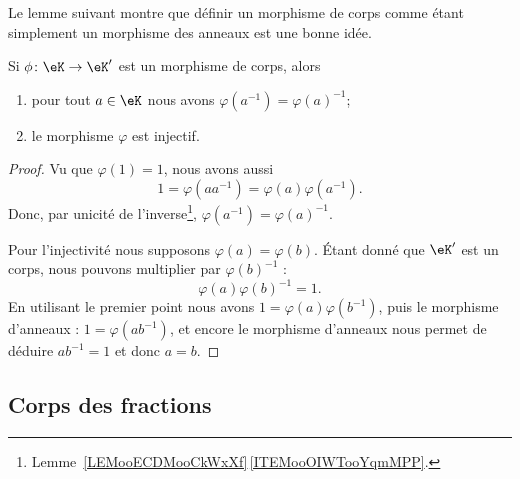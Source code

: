 Le lemme suivant montre que définir un morphisme de corps comme étant simplement un morphisme des anneaux est une bonne idée.
\begin{lemma}       \label{LEMooWBOPooZnsZgQ}
    Si \( \phi\colon \eK\to \eK'\) est un morphisme de corps, alors
    \begin{enumerate}
        \item
            pour tout \( a\in \eK\) nous avons \( \varphi(a^{-1})=\varphi(a)^{-1}\);
        \item
            le morphisme \( \varphi\) est injectif.
    \end{enumerate}
\end{lemma}

\begin{proof}
    Vu que \( \varphi(1)=1\), nous avons aussi
    \begin{equation}
        1=\varphi(aa^{-1})=\varphi(a)\varphi(a^{-1}).
    \end{equation}
    Donc, par unicité de l'inverse\footnote{Lemme~\ref{LEMooECDMooCkWxXf}\,\ref{ITEMooOIWTooYqmMPP}.}, \( \varphi(a^{-1})=\varphi(a)^{-1}\).

    Pour l'injectivité nous supposons \( \varphi(a)=\varphi(b)\). Étant donné que \( \eK'\) est un corps, nous pouvons multiplier par \( \varphi(b)^{-1}\) :
    \begin{equation}
        \varphi(a)\varphi(b)^{-1}=1.
    \end{equation}
    En utilisant le premier point nous avons \( 1=\varphi(a)\varphi(b^{-1})\), puis le morphisme d'anneaux : \( 1=\varphi(ab^{-1})\), et encore le morphisme d'anneaux nous permet de déduire \( ab^{-1}=1\) et donc \(a=b\).
\end{proof}

\subsection{Corps des fractions}

